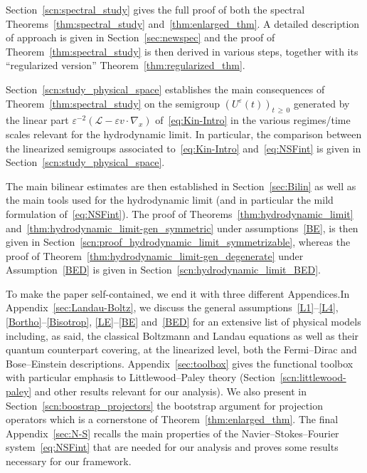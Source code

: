 \documentclass[AHL,Unicode,longabstracts,published]{cedram}
\newcommand{\LL}{\mathcal{L}}
\renewcommand*\geq{\geqslant}
\newcommand*\eps{{\varepsilon}}
\begin{document}
Section~\ref{scn:spectral_study} gives the full proof of both the spectral Theorems~\ref{thm:spectral_study} and~\ref{thm:enlarged_thm}. A detailed description of approach is given in Section~\ref{sec:newspec} and the proof of Theorem~\ref{thm:spectral_study} is then derived in various steps, together with its ``regularized version'' Theorem~\ref{thm:regularized_thm}.

Section~\ref{scn:study_physical_space} establishes the main consequences of Theorem~\ref{thm:spectral_study} on the semigroup $(U^\eps(t))_{t\,\geq\,0}$ generated by the linear part $\eps^{-2} (\LL - \eps v \cdot \nabla_x)$ of~\eqref{eq:Kin-Intro} in the various regimes/time scales relevant for the hydrodynamic limit. In particular, the comparison between the linearized semigroups associated to~\eqref{eq:Kin-Intro} and~\eqref{eq:NSFint} is given in Section~\ref{scn:study_physical_space}.

The main bilinear estimates are then established in Section~\ref{sec:Bilin} as well as the main tools used for the hydrodynamic limit (and in particular the mild formulation of~\eqref{eq:NSFint}). The proof of Theorems~\ref{thm:hydrodynamic_limit} and~\ref{thm:hydrodynamic_limit-gen_symmetric} under assumptions~\ref{BE}, is then given in Section~\ref{scn:proof_hydrodynamic_limit_symmetrizable}, whereas the proof of Theorem~\ref{thm:hydrodynamic_limit-gen_degenerate} under Assumption~\eqref{BED} is given in Section~\ref{scn:hydrodynamic_limit_BED}.

To make the paper self-contained, we end it with three different Appendices.In Appendix~\ref{sec:Landau-Boltz}, we discuss the general assumptions~\eqref{L1}--\eqref{L4}, \eqref{Bortho}--\eqref{Bisotrop}, \eqref{LE}--\eqref{BE} and~\eqref{BED} for an extensive list of physical models including, as said, the classical Boltzmann and Landau equations as well as their quantum counterpart covering, at the linearized level, both the Fermi--Dirac and Bose--Einstein descriptions. Appendix~\ref{sec:toolbox} gives the functional toolbox with particular emphasis to Littlewood--Paley theory (Section~\ref{scn:littlewood-paley} and other results relevant for our analysis). We also present in Section~\ref{scn:boostrap_projectors} the bootstrap argument for projection operators which is a cornerstone of Theorem~\ref{thm:enlarged_thm}. The final Appendix~\ref{sec:N-S} recalls the main properties of the Navier--Stokes--Fourier system~\eqref{eq:NSFint} that are needed for our analysis {and proves some results necessary for our framework}.
\end{document}

